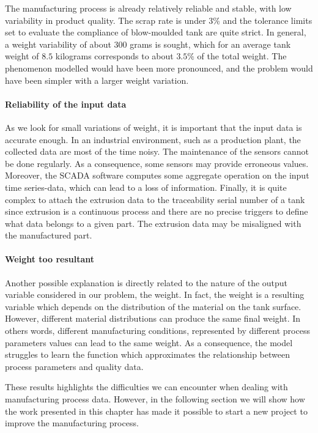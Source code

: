 The manufacturing process is already relatively reliable and stable, with low variability in product quality. The scrap rate is under 3\% and the tolerance limits set to evaluate the compliance of blow-moulded tank are quite strict. In general, a weight variability of about 300 grams is sought, which for an average tank weight of $8.5$ kilograms corresponds to about $3.5\%$ of the total weight. The phenomenon modelled would have been more pronounced, and the problem would have been simpler with a larger weight variation.     

\paragraph{Reliability of the input data}

As we look for small variations of weight, it is important that the input data is accurate enough. In an industrial environment, such as a production plant, the collected data are most of the time noisy. The maintenance of the sensors cannot be done regularly. As a consequence, some sensors may provide erroneous values. Moreover, the SCADA software computes some aggregate operation on the input time series-data, which can lead to a loss of information. Finally, it is quite complex to attach the extrusion data to the traceability serial number of a tank since extrusion is a continuous process and there are no precise triggers to define what data belongs to a given part. The extrusion data may be misaligned with the manufactured part.  

\paragraph{Weight too resultant}

Another possible explanation is directly related to the nature of the output variable considered in our problem, the weight. In fact, the weight is a resulting variable which depends on the distribution of the material on the tank surface. However, different material distributions can produce the same final weight. In others words, different manufacturing conditions, represented by different process parameters values can lead to the same weight. As a consequence, the model struggles to learn the function which approximates the relationship between process parameters and quality data.

These results highlights the difficulties we can encounter when dealing with manufacturing process data. However, in the following section we will show how the work presented in this chapter has made it possible to start a new project to improve the manufacturing process. 


